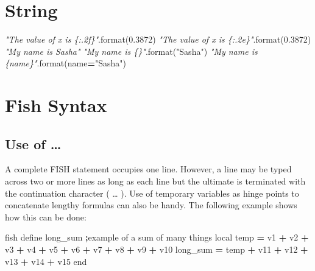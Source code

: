 \documentclass[a4paper, nobind]{templates/ociamthesis}
\newenvironment{Shaded}{\begin{snugshade}}{\end{snugshade}}
\newcommand{\BuiltInTok}[1]{#1}
\newcommand{\CommentTok}[1]{\textcolor[rgb]{0.56,0.35,0.01}{\textit{#1}}}
\newcommand{\FloatTok}[1]{\textcolor[rgb]{0.00,0.00,0.81}{#1}}
\newcommand{\NormalTok}[1]{#1}
\newcommand{\OperatorTok}[1]{\textcolor[rgb]{0.81,0.36,0.00}{\textbf{#1}}}
\newcommand{\StringTok}[1]{\textcolor[rgb]{0.31,0.60,0.02}{#1}}
\renewenvironment{Shaded}
{
  \vspace{10pt}%
  \begin{snugshade}%
}{%
  \end{snugshade}%
  \vspace{8pt}%
}
\begin{document}
\hypertarget{string}{%
\section{String}\label{string}}

\begin{Shaded}
\begin{Highlighting}[]
\CommentTok{"The value of x is \{:.2f\}"}\NormalTok{.}\BuiltInTok{format}\NormalTok{(}\FloatTok{0.3872}\NormalTok{)}
\CommentTok{"The value of x is \{:.2e\}"}\NormalTok{.}\BuiltInTok{format}\NormalTok{(}\FloatTok{0.3872}\NormalTok{)}
\CommentTok{"My name is Sasha"}
\CommentTok{"My name is \{\}"}\NormalTok{.}\BuiltInTok{format}\NormalTok{(}\StringTok{"Sasha"}\NormalTok{)}
\CommentTok{"My name is \{name\}"}\NormalTok{.}\BuiltInTok{format}\NormalTok{(name}\OperatorTok{=}\StringTok{"Sasha"}\NormalTok{)}
\end{Highlighting}
\end{Shaded}

\hypertarget{fish-syntax}{%
\section{Fish Syntax}\label{fish-syntax}}

\hypertarget{use-of}{%
\subsection{Use of \ldots{}}\label{use-of}}

A complete FISH statement occupies one line. However, a line may be typed across two or more lines as long as each line but the ultimate is terminated with the continuation character ( \ldots{} ). Use of temporary variables as hinge points to concatenate lengthy formulas can also be handy. The following example shows how this can be done:

\begin{Shaded}
\begin{Highlighting}[]
\NormalTok{fish define long\_sum  }\OperatorTok{;}\NormalTok{example of a }\BuiltInTok{sum}\NormalTok{ of many things}
\NormalTok{    local temp }\OperatorTok{=}\NormalTok{ v1 }\OperatorTok{+}\NormalTok{ v2 }\OperatorTok{+}\NormalTok{ v3 }\OperatorTok{+}\NormalTok{ v4 }\OperatorTok{+}\NormalTok{ v5 }\OperatorTok{+}\NormalTok{ v6 }\OperatorTok{+}\NormalTok{ v7 }\OperatorTok{+}\NormalTok{ v8 }\OperatorTok{+}\NormalTok{ v9 }\OperatorTok{+}\NormalTok{ v10}
\NormalTok{    long\_sum }\OperatorTok{=}\NormalTok{ temp }\OperatorTok{+}\NormalTok{ v11 }\OperatorTok{+}\NormalTok{ v12 }\OperatorTok{+}\NormalTok{ v13 }\OperatorTok{+}\NormalTok{ v14 }\OperatorTok{+}\NormalTok{ v15}
\NormalTok{end}
\end{Highlighting}
\end{Shaded}
\end{document}
